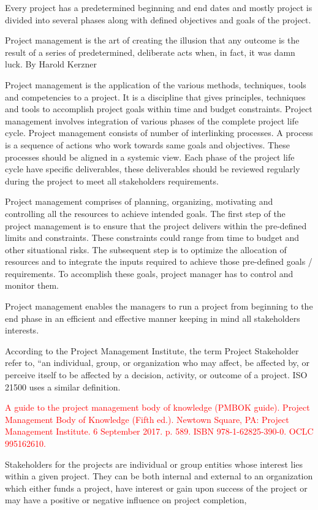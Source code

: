 Every project has a predetermined beginning and end dates and mostly project is divided into several phases along with defined objectives and goals of the project.

Project management is the art of creating the illusion that any outcome is the result of a series of predetermined, deliberate acts when, in fact, it was damn luck. By Harold Kerzner

Project management is the application of the various methods, techniques, tools and competencies to a project. It is a discipline that gives principles, techniques and tools to accomplish project goals within time and budget constraints. Project management involves integration of various phases of the complete project life cycle. Project management consists of number of interlinking processes. A process is a sequence of actions who work towards same goals and objectives. These processes should be aligned in a systemic view. Each phase of the project life cycle have specific deliverables, these deliverables should be reviewed regularly during the project to meet all stakeholders requirements.

Project management comprises of planning, organizing, motivating and controlling all the resources to achieve intended goals. The first step of the project management is to ensure that the project delivers within the pre-defined limits and constraints. These constraints could range from time to budget and other situational risks. The subsequent step is to optimize the allocation of resources and to integrate the inputs required to achieve those pre-defined goals / requirements. To accomplish these goals, project manager has to control and monitor them. 

Project management enables the managers to run a project from beginning to the end phase in an efficient and effective manner keeping in mind all stakeholders interests.

According to the Project Management Institute, the term Project Stakeholder refer to, “an individual, group, or organization who may affect, be affected by, or perceive itself to be affected by a decision, activity, or outcome of a project. ISO 21500 uses a similar definition. 


\textcolor{red}{A guide to the project management body of knowledge (PMBOK guide). Project Management Body of Knowledge (Fifth ed.). Newtown Square, PA: Project Management Institute. 6 September 2017. p. 589. ISBN 978-1-62825-390-0. OCLC 995162610.}

Stakeholders for the projects are individual or group entities whose interest lies within a given project. They can be both internal and external to an organization which either funds a project, have interest or gain upon success of the project or may have a positive or negative influence on project completion,

